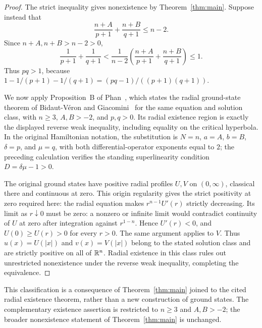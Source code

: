 \begin{proof}
The strict inequality gives nonexistence by Theorem~\ref{thm:main}.
Suppose instead that
\[
 \frac{n+A}{p+1}+\frac{n+B}{q+1}\le n-2.
\]
Since \(n+A,n+B>n-2>0\),
\[
 \frac1{p+1}+\frac1{q+1}
 <\frac1{n-2}\left(\frac{n+A}{p+1}+\frac{n+B}{q+1}\right)
 \le1.
\]
Thus \(pq>1\), because
\(1-1/(p+1)-1/(q+1)=(pq-1)/((p+1)(q+1))\).

We now apply Proposition~B of Phan~\cite{Phan}, which states the radial
ground-state theorem of Bidaut-V\'eron and
Giacomini~\cite[Theorem~1.4(i)]{BidautVeronGiacomini2010} for the same
equation and solution class, with \(n\ge3\), \(A,B>-2\), and \(p,q>0\).
Its radial existence region is exactly the displayed reverse weak
inequality, including equality on the critical hyperbola. In the original
Hamiltonian notation, the substitution is \(N=n\), \(a=A\), \(b=B\),
\(\delta=p\), and \(\mu=q\), with both differential-operator exponents
equal to \(2\); the preceding calculation verifies the standing
superlinearity condition \(D=\delta\mu-1>0\).

The original ground states have positive radial profiles \(U,V\) on
\((0,\infty)\), classical there and continuous at zero. This origin
regularity gives the strict positivity at zero required here: the radial
equation makes
\(r^{n-1}U'(r)\) strictly decreasing. Its limit as \(r\downarrow0\)
must be zero: a nonzero or infinite limit would contradict continuity
of \(U\) at zero after integration against \(r^{1-n}\). Hence
\(U'(r)<0\), and \(U(0)\ge U(r)>0\) for every \(r>0\). The same
argument applies to \(V\). Thus \(u(x)=U(|x|)\) and
\(v(x)=V(|x|)\) belong to the stated solution class and are strictly
positive on all of \(\mathbb R^n\). Radial existence in this class rules out
unrestricted nonexistence under the reverse weak inequality, completing
the equivalence.
\end{proof}

This classification is a consequence of Theorem~\ref{thm:main} joined
to the cited radial existence theorem, rather than a new construction
of ground states. The complementary existence assertion is restricted
to \(n\ge3\) and \(A,B>-2\); the broader nonexistence statement of
Theorem~\ref{thm:main} is unchanged.
